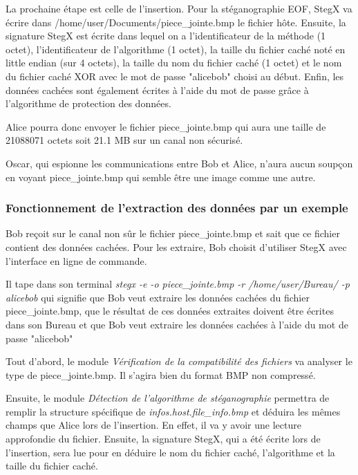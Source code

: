 \documentclass[11pt]{article}
\begin{document}
La prochaine étape est celle de l'insertion. Pour la stéganographie EOF, 
StegX va écrire dans /home/user/Documents/piece\_jointe.bmp le fichier hôte. 
Ensuite, la signature StegX est écrite dans lequel on a l'identificateur 
de la méthode (1 octet), l'identificateur de l'algorithme (1 octet), la 
taille du fichier caché noté en little endian (sur 4 octets), la taille du 
nom du fichier caché (1 octet) et le nom du fichier caché XOR avec le mot 
de passe "alicebob" choisi au début. 
Enfin, les données cachées sont également écrites à l'aide du mot de passe
grâce à l'algorithme de protection des données. 

Alice pourra donc envoyer le fichier piece\_jointe.bmp qui aura une taille 
de 21088071 octets soit 21.1 MB sur un canal non sécurisé. 

Oscar, qui espionne les communications entre Bob et Alice, n'aura aucun 
soupçon en voyant piece\_jointe.bmp qui semble être une image comme une 
autre. 

\subsubsection{Fonctionnement de l'extraction des données par un exemple}

Bob reçoit sur le canal non sûr le fichier piece\_jointe.bmp et sait que 
ce fichier contient des données cachées. Pour les extraire, Bob choisit 
d'utiliser StegX avec l'interface en ligne de commande. 

Il tape dans son terminal \textit{stegx -e -o piece\_jointe.bmp -r 
/home/user/Bureau/ -p alicebob} qui signifie que Bob veut extraire les 
données cachées du fichier piece\_jointe.bmp, que le résultat de ces 
données extraites doivent être écrites dans son Bureau et que Bob veut 
extraire les données cachées à l'aide du mot de passe "alicebob"

Tout d'abord, le module \textit{Vérification de la compatibilité des 
fichiers} va analyser le type de piece\_jointe.bmp. Il s'agira bien du 
format BMP non compressé. 

Ensuite, le module \textit{Détection de l'algorithme de stéganographie}
permettra de remplir la structure spécifique de \textit{infos.host.file\_info.bmp}
et déduira les mêmes champs que Alice lors de l'insertion. En effet, 
il va y avoir une lecture approfondie du fichier. Ensuite, la signature 
StegX, qui a été écrite lors de l'insertion, sera lue pour en déduire 
le nom du fichier caché, l'algorithme et la taille du fichier caché. 
\end{document}
